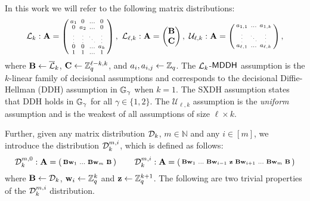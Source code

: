 In this work we will refer to the following matrix distributions: 
\[
\mathcal{L}_{k}:\mathbf{{A}} = \left( \begin{smallmatrix}
    a_1 & 0 &  \ldots & 0 \\
    0 &  a_2 &  \ldots & 0\\
    \tiny{\vdots} &  \tiny{\vdots}  &  \tiny{\ddots} & \tiny{\vdots} \\
    0 & 0 &  \ldots  & a_{k}\\
    1 & 1 & \ldots & 1
\end{smallmatrix} \right),
\
\mathcal{L}_{\ell,k}:\mathbf{{A}} = \left( \begin{matrix}
    \mathbf{{B}}\\\mathbf{{C}}
\end{matrix} \right),
\
\mathcal{U}_{\ell,k}: \mathbf{{A}} = \left( \begin{smallmatrix}
    a_{1,1} &  \ldots & a_{1,k}  \\
    \tiny{\vdots} & \tiny{\ddots}  & \tiny{\vdots} \\
    a_{\ell,1} &  \ldots &  a_{\ell,k} 
\end{smallmatrix} \right),
\]
where $\mathbf{{B}}\gets\overline{\mathcal{L}}_k$, $\mathbf{{C}}\gets\mathbb{Z}_q^{\ell-k,k}$, and $a_i,a_{i,j}\leftarrow \mathbb{Z}_q$.  The $\mathcal{L}_{k}$-$\mathsf{MDDH}$ assumption is the $k$-linear family of decisional assumptions
and corresponds to 
 the decisional Diffie-Hellman (DDH)
assumption in $\mathbb{G}_\gamma$ when $k=1$. The SXDH assumption states that DDH holds in $\mathbb{G}_\gamma$ for all $\gamma \in \{1,2\}$. The $\mathcal{U}_{\ell,k}$ assumption is the \textit{uniform} assumption and is the weakest of all assumptions of size $\ell \times k$. 

Further, given any matrix distribution $\mathcal{D}_{k}$, $m \in \mathbb{N}$ and any $i \in [m]$, we introduce the distribution $\mathcal{D}_k^{m,i}$, which is defined as follows: 
\[ \mathcal{D}_k^{m,0}: \mathbf{{A}} = \left(\begin{smallmatrix} \mathbf{{B}}\mathbf{w}_1 & \ldots &  
  \mathbf{{B}}\mathbf{w}_{m} & \mathbf{{B}}  \end{smallmatrix} \right)  \qquad
\mathcal{D}_k^{m,i}:\mathbf{{A}} = \left(\begin{smallmatrix} \mathbf{{B}}\mathbf{w}_1 & \ldots & \mathbf{{B}}\mathbf{w}_{i-1} 
& \mathbf{z} &  \mathbf{{B}}\mathbf{w}_{i+1} & \ldots &  
  \mathbf{{B}}\mathbf{w}_{m} & \mathbf{{B}}  \end{smallmatrix} \right) 
\]
where $\mathbf{{B}} \leftarrow \mathcal{D}_{k}$, $\mathbf{w}_i \leftarrow \mathbb{Z}_q^k$ and $\mathbf{z} \leftarrow \mathbb{Z}_q^{k+1}$. The following are two trivial properties of the $\mathcal{D}_k^{m,i}$ distribution. 

